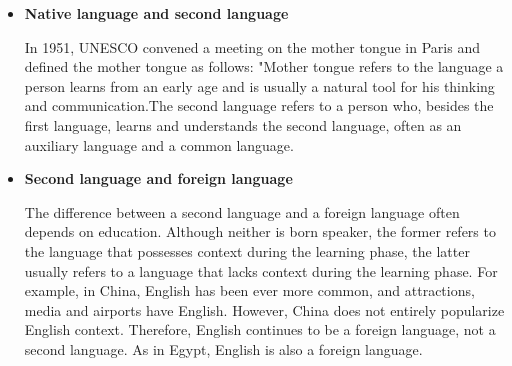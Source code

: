 \begin{itemize}
	\item \textbf{Native language and second language}
	\par In 1951, UNESCO convened a meeting on the mother tongue in Paris and defined the mother tongue as follows: "Mother tongue refers to the language a person learns from an early age and is usually a natural tool for his thinking and communication.The second language refers to a person who, besides the first language, learns and understands the second language, often as an auxiliary language and a common language.
	\item \textbf{Second language and foreign language}
	\par The difference between a second language and a foreign language often depends on education. Although neither is born speaker, the former refers to the language that possesses context during the learning phase, the latter usually refers to a language that lacks context during the learning phase.
	For example, in China, English has been ever more common, and attractions, media and airports have English. However, China does not entirely popularize English context. Therefore, English continues to be a foreign language, not a second language. As in Egypt, English is also a foreign language.
\end{itemize}